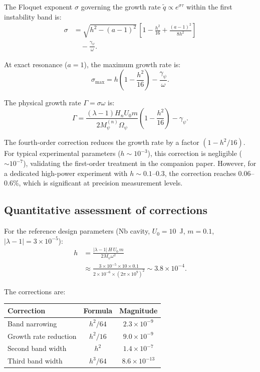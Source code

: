 \documentclass[12pt,aps,prd,twocolumn,superscriptaddress,nofootinbib]{revtex4-2}
\newcommand{\Opsi}{\Omega_\psi}
\newcommand{\gpsi}{\gamma_\psi}
\newcommand{\Mpsi}{M_\psi}
\begin{document}
The Floquet exponent $\sigma$ governing the growth rate
$\tilde{q} \propto e^{\sigma\tau}$ within the first instability band is:
\begin{align}
\sigma &= \sqrt{h^2 - (a-1)^2}\,\left[1 - \frac{h^2}{16}
+ \frac{(a-1)^2}{8h^2}\right]
\nonumber\\
&\quad - \frac{\gpsi}{\omega}.
\label{eq:floquet}
\end{align}

At exact resonance ($a=1$), the maximum growth rate is:
\begin{equation}
\sigma_{\max} = h\left(1 - \frac{h^2}{16}\right) - \frac{\gpsi}{\omega}.
\label{eq:sigma_max}
\end{equation}

The physical growth rate $\Gamma = \sigma\omega$ is:
\begin{equation}
\boxed{
\Gamma = \frac{(\lambda-1)H_n U_0 m}{2\Mpsi^{(n)}\Opsi}
\left(1 - \frac{h^2}{16}\right) - \gpsi.
}
\label{eq:Gamma_4th}
\end{equation}

The fourth-order correction reduces the growth rate by a factor
$(1-h^2/16)$.  For typical experimental parameters ($h \sim 10^{-3}$),
this correction is negligible ($\sim 10^{-7}$), validating the
first-order treatment in the companion paper.  However, for a
dedicated high-power experiment with $h \sim 0.1$--$0.3$, the
correction reaches 0.06--0.6\%, which is significant at precision
measurement levels.

\subsection{Quantitative assessment of corrections}
\label{sec:corrections_assessment}

For the reference design parameters (Nb cavity, $U_0 = 10$~J,
$m=0.1$, $|\lambda-1| = 3\times10^{-5}$):
\begin{align}
h &= \frac{|\lambda-1|\,H\,U_0\,m}{2\Mpsi\omega^2}
\nonumber\\
&\approx \frac{3\times10^{-5}\times 10\times 0.1}
{2\times 10^{-6}\times (2\pi\times10^9)^2}
\sim 3.8\times10^{-4}.
\label{eq:h_numerical}
\end{align}

The corrections are:
\begin{center}
\begin{tabular}{lcc}
\toprule
Correction & Formula & Magnitude \\
\midrule
Band narrowing & $h^2/64$ & $2.3\times10^{-9}$ \\
Growth rate reduction & $h^2/16$ & $9.0\times10^{-9}$ \\
Second band width & $h^2$ & $1.4\times10^{-7}$ \\
Third band width & $h^3/64$ & $8.6\times10^{-13}$ \\
\bottomrule
\end{tabular}
\end{center}
\end{document}
